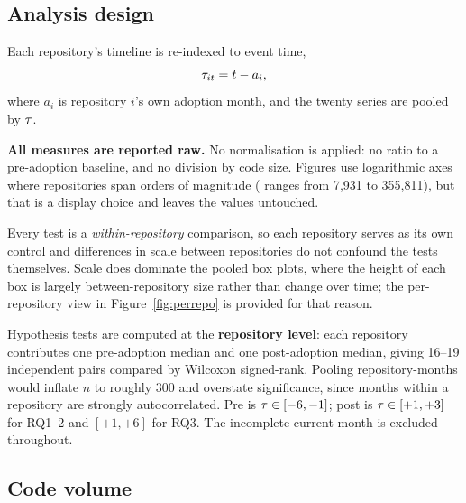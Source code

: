 \documentclass[11pt,a4paper]{article}
\begin{document}
\subsection{Analysis design}
\label{sec:design}

Each repository's timeline is re-indexed to event time,
\begin{equation}
  \tau_{it} = t - a_i ,
  \label{eq:eventtime}
\end{equation}
where $a_i$ is repository $i$'s own adoption month, and the twenty series are
pooled by $\tau$.

\textbf{All measures are reported raw.} No normalisation is applied: no ratio
to a pre-adoption baseline, and no division by code size. Figures use
logarithmic axes where repositories span orders of magnitude (
ranges from 7,931 to 355,811), but that is a display choice and leaves the
values untouched.

Every test is a \emph{within-repository} comparison, so each repository serves
as its own control and differences in scale between repositories do not
confound the tests themselves. Scale does dominate the pooled box plots, where
the height of each box is largely between-repository size rather than change
over time; the per-repository view in Figure~\ref{fig:perrepo} is provided for
that reason.

Hypothesis tests are computed at the \textbf{repository level}: each repository
contributes one pre-adoption median and one post-adoption median, giving 16--19
independent pairs compared by Wilcoxon signed-rank. Pooling repository-months
would inflate $n$ to roughly 300 and overstate significance, since months
within a repository are strongly autocorrelated. Pre is $\tau\in[-6,-1]$; post
is $\tau\in[+1,+3]$ for RQ1--2 and $[+1,+6]$ for RQ3. The incomplete current
month is excluded throughout.

\label{sec:results}

\subsection{Code volume}
\label{sec:volume}
\end{document}
